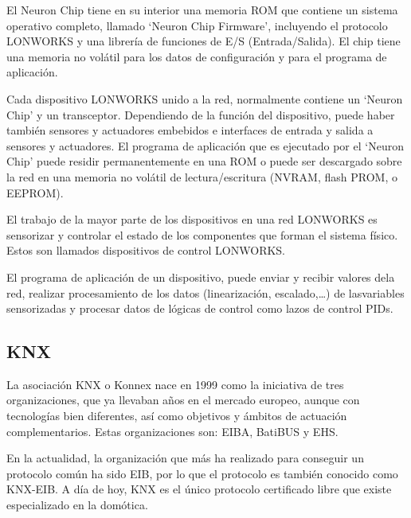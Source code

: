 El Neuron Chip tiene en su interior una memoria ROM que contiene un sistema operativo completo, llamado ‘Neuron Chip Firmware’, incluyendo el protocolo LONWORKS y una librería de funciones de E/S (Entrada/Salida). El chip tiene una memoria no vol\'atil para los datos de configuración y para el programa de aplicación.


Cada dispositivo LONWORKS unido a la red, normalmente contiene un ‘Neuron Chip’ y un transceptor. Dependiendo de la función del dispositivo, puede haber también sensores y actuadores embebidos e interfaces de entrada y salida a sensores y actuadores. El programa de aplicación que es ejecutado por el ‘Neuron Chip’ puede residir permanentemente en una ROM o puede ser descargado sobre la red en una memoria no vol\'atil de lectura/escritura (NVRAM, flash PROM, o EEPROM).


El trabajo de la mayor parte de los dispositivos en una red LONWORKS es sensorizar y controlar el estado de los componentes que forman el sistema físico. Estos son llamados dispositivos de control LONWORKS.


El programa de aplicación de un dispositivo, puede enviar y recibir valores dela red, realizar procesamiento de los datos (linearización, escalado,…) de lasvariables sensorizadas y procesar datos de lógicas de control como lazos de control PIDs.

\subsection{KNX}
La asociación KNX o Konnex nace en 1999 como la iniciativa de tres organizaciones, que ya llevaban años en el mercado europeo, aunque con tecnologías bien diferentes, así como objetivos y \'ambitos de actuación complementarios. Estas organizaciones son: EIBA, BatiBUS y EHS.


En la actualidad, la organización que m\'as ha realizado para conseguir un protocolo común ha sido EIB, por lo que el protocolo es también conocido como KNX-EIB. A día de hoy, KNX es el único protocolo certificado libre que existe especializado en la domótica.


